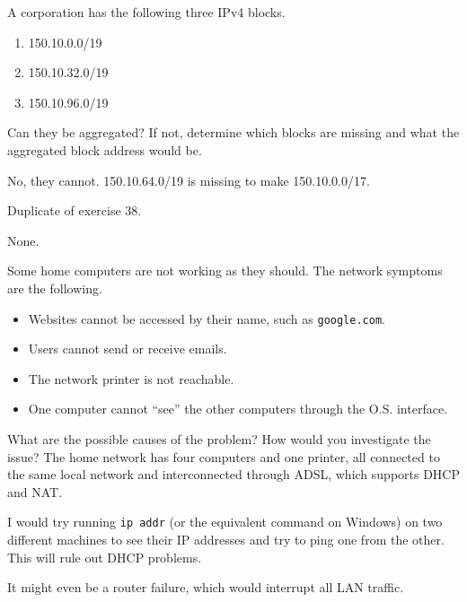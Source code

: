 \begin{Exercise}
A corporation has the following three IPv4 blocks.
\begin{enumerate}
\item 150.10.0.0/19
\item 150.10.32.0/19
\item 150.10.96.0/19
\end{enumerate}
Can they be aggregated?
If not, determine which blocks are missing and what the aggregated block address would be.
\end{Exercise}
\begin{Answer}
No, they cannot. 150.10.64.0/19 is missing to make 150.10.0.0/17.
\end{Answer}

\begin{Exercise}
Duplicate of exercise 38.
\end{Exercise}
\begin{Answer}
None.
\end{Answer}

\begin{Exercise}
Some home computers are not working as they should. The network symptoms are the following.
\begin{itemize}
\item Websites cannot be accessed by their name, such as \texttt{google.com}.
\item Users cannot send or receive emails.
\item The network printer is not reachable.
\item One computer cannot ``see'' the other computers through the O.S. interface.
\end{itemize}
What are the possible causes of the problem?
How would you investigate the issue?
The home network has four computers and one printer, all connected to the same local network and interconnected through ADSL, which supports DHCP and NAT.
\end{Exercise}
\begin{Answer}
I would try running \texttt{ip addr} (or the equivalent command on Windows) on two different machines to see their IP addresses and try to ping one from the other. This will rule out DHCP problems.

It might even be a router failure, which would interrupt all LAN traffic.
\end{Answer}


